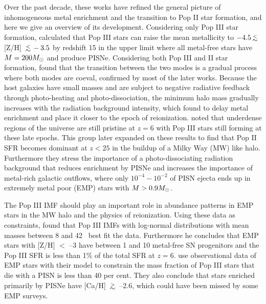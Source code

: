 \documentclass[apjl]{emulateapj}
\begin{document}
Over the past decade, these works have refined the general picture of
inhomogeneous metal enrichment and the transition to Pop II star
formation, and here we give an overview of its development.
Considering only Pop III star formation, \citeauthor{Yoshida04}
calculated that Pop III stars can raise the mean metallicity to $-4.5
\lsim$ [Z/H] $\lsim -3.5$ by redshift 15 in the upper limit where all
metal-free stars have $M = 200 \Ms$ and produce PISNe.  Considering
both Pop III and II star formation, \citeauthor{Scannapieco03} found
that the transition between the two modes is a gradual process where
both modes are coeval, confirmed by most of the later works.  Because
the host galaxies have small masses and are subject to negative
radiative feedback through photo-heating and photo-dissociation, the
minimum halo mass gradually increases with the radiation background
intensity, which \citeauthor{Furlanetto05_Reion} found to delay metal
enrichment and place it closer to the epoch of reionization.
\citeauthor{Trenti09} noted that underdense regions of the universe
are still pristine at $z=6$ with Pop III stars still forming at these
late epochs.  This group later expanded on these results to find that
Pop II SFR becomes dominant at $z<25$ in the buildup of a Milky Way
(MW) like halo.  Furthermore they stress the importance of a
photo-dissociating radiation background that reduces enrichment by
PISNe and increases the importance of metal-rich galactic outflows,
where only $10^{-4} - 10^{-2}$ of PISN ejecta ends up in extremely
metal poor (EMP) stars with $M > 0.9 \Ms$.

The Pop III IMF should play an important role in abundance patterns in
EMP stars in the MW halo and the physics of reionization.  Using these
data as constraints, \citeauthor{Tumlinson06} found that Pop III IMFs
with log-normal distributions with mean masses between 8 and 42
\Ms~best fit the data.  Furthermore he concludes that EMP stars with
[Z/H] $<$ --3 have between 1 and 10 metal-free SN progenitors and
the Pop III SFR is less than 1\% of the total SFR at $z=6$.
\citeauthor{Karlsson08} use observational data of EMP stars with
their model to constrain the mass fraction of Pop III stars that
die with a PISN is less than 40 per cent.  They also conclude that
stars enriched primarily by PISNe have [Ca/H] $\gsim$ --2.6, which
could have been missed by some EMP surveys.
\end{document}
